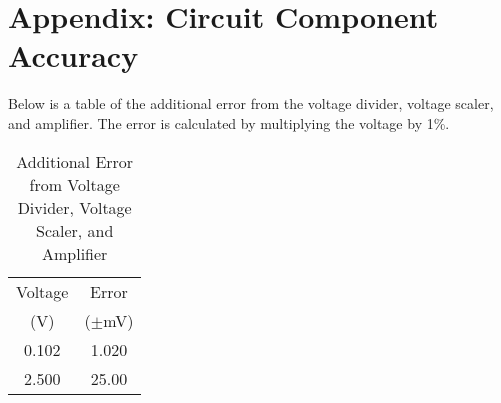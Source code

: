 \section{Appendix: Circuit Component Accuracy}
\label{sec:appendix-circuit-component-accuracy}
Below is a table of the additional error from the voltage divider, voltage scaler, and amplifier. The error is calculated by multiplying the voltage by 1\%.

\begin{table}[h]
    \centering
    \caption{Additional Error from Voltage Divider, Voltage Scaler, and Amplifier}
    \begin{tabular}{cc}
        \toprule 
        Voltage & Error \\
        (V) & ($\pm$mV) \\
        \midrule
    0.102 & 1.020  \\
    2.500 & 25.00 \\
    \bottomrule
    \end{tabular}
\end{table}